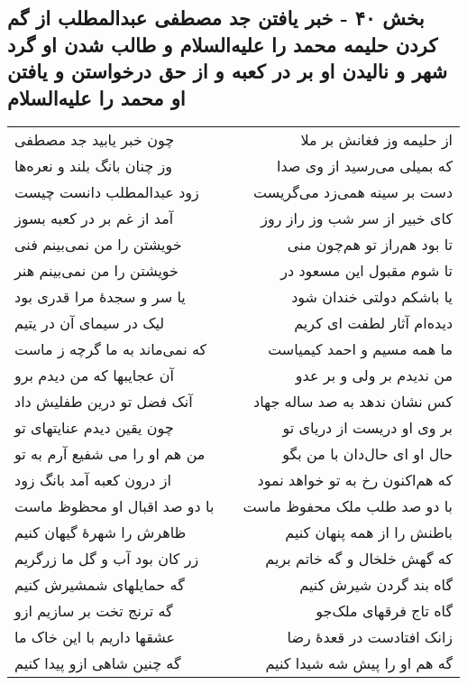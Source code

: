 \begin{center}
\section*{بخش ۴۰ - خبر یافتن جد مصطفی عبدالمطلب  از گم کردن حلیمه محمد  را علیه‌السلام و طالب شدن او گرد شهر و نالیدن او بر در کعبه و از حق درخواستن و یافتن او محمد را علیه‌السلام}
\label{sec:sh040}
\begin{longtable}{l p{0.5cm} r}
چون خبر یابید جد مصطفی
&&
از حلیمه وز فغانش بر ملا
\\
وز چنان بانگ بلند و نعره‌ها
&&
که بمیلی می‌رسید از وی صدا
\\
زود عبدالمطلب دانست چیست
&&
دست بر سینه همی‌زد می‌گریست
\\
آمد از غم بر در کعبه بسوز
&&
کای خبیر از سر شب وز راز روز
\\
خویشتن را من نمی‌بینم فنی
&&
تا بود هم‌راز تو هم‌چون منی
\\
خویشتن را من نمی‌بینم هنر
&&
تا شوم مقبول این مسعود در
\\
یا سر و سجدهٔ مرا قدری بود
&&
یا باشکم دولتی خندان شود
\\
لیک در سیمای آن در یتیم
&&
دیده‌ام آثار لطفت ای کریم
\\
که نمی‌ماند به ما گرچه ز ماست
&&
ما همه مسیم و احمد کیمیاست
\\
آن عجایبها که من دیدم برو
&&
من ندیدم بر ولی و بر عدو
\\
آنک فضل تو درین طفلیش داد
&&
کس نشان ندهد به صد ساله جهاد
\\
چون یقین دیدم عنایتهای تو
&&
بر وی او دریست از دریای تو
\\
من هم او را می شفیع آرم به تو
&&
حال او ای حال‌دان با من بگو
\\
از درون کعبه آمد بانگ زود
&&
که هم‌اکنون رخ به تو خواهد نمود
\\
با دو صد اقبال او محظوظ ماست
&&
با دو صد طلب ملک محفوظ ماست
\\
ظاهرش را شهرهٔ گیهان کنیم
&&
باطنش را از همه پنهان کنیم
\\
زر کان بود آب و گل ما زرگریم
&&
که گهش خلخال و گه خاتم بریم
\\
گه حمایلهای شمشیرش کنیم
&&
گاه بند گردن شیرش کنیم
\\
گه ترنج تخت بر سازیم ازو
&&
گاه تاج فرقهای ملک‌جو
\\
عشقها داریم با این خاک ما
&&
زانک افتادست در قعدهٔ رضا
\\
گه چنین شاهی ازو پیدا کنیم
&&
گه هم او را پیش شه شیدا کنیم
\\

\end{longtable}
\end{center}
